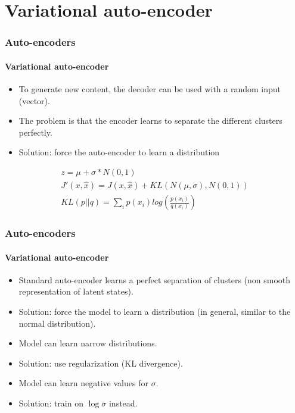 \documentclass[xcolor=table]{beamer}
\begin{document}
\section{Variational auto-encoder}

\begin{frame}
	\frametitle{Auto-encoders}
	\framesubtitle{Variational auto-encoder}

\begin{itemize}
	\item To generate new content, the decoder can be used with a random input (vector).
	\item The problem is that the encoder learns to separate the different clusters perfectly.
	\item Solution: force the auto-encoder to learn a distribution 
\end{itemize}

\begin{minipage}{0.60\textwidth} 
	\begin{align*}
	z = \mu + \sigma * N(0, 1) \\
	J'(x, \hat{x}) = J(x, \hat{x}) + KL(N(\mu, \sigma), N(0, 1)) \\
	KL(p||q) = \sum_i p(x_i) log(\frac{p(x_i)}{q(x_i)})
	\end{align*}
\end{minipage}
%
\begin{minipage}{0.39\textwidth}
\end{minipage}

\end{frame}

\begin{frame}
	\frametitle{Auto-encoders}
	\framesubtitle{Variational auto-encoder}

\begin{itemize}
	\item Standard auto-encoder learns a perfect separation of clusters (non smooth representation of latent states).
	\item Solution: force the model to learn a distribution (in general, similar to the normal distribution).
	\item Model can learn narrow distributions.
	\item Solution: use regularization (KL divergence).
	\item Model can learn negative values for $\sigma$.
	\item Solution: train on $\log \sigma$ instead.
\end{itemize}

\end{frame}

\end{document}
